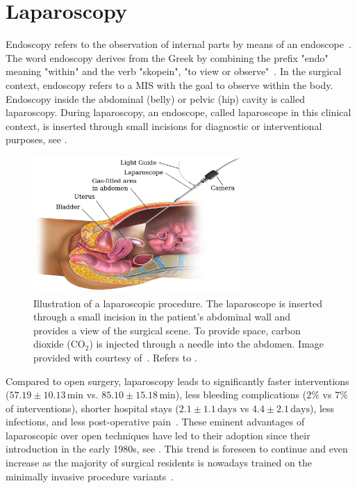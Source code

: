 \section{Laparoscopy}
\label{in:sec:laparoscopy}
Endoscopy refers to the observation of internal parts by means of an endoscope~\cite{oedendoscopy}. The word endoscopy derives from the Greek by combining the prefix "endo" meaning "within" and the verb "skopein", "to view or observe"~\cite{majumdar1993short}. In the surgical context, endoscopy refers to a MIS with the goal to observe within the body. Endoscopy inside the abdominal (belly) or pelvic (hip) cavity is called laparoscopy. During laparoscopy, an endoscope, called laparoscope in this clinical context, is inserted through small incisions for diagnostic or interventional purposes, see .
\begin{figure}[tb]
    \centering
    \includegraphics[width=0.7\textwidth]{introduction/img/laparoscopy.jpg}
    \caption{Illustration of a laparoscopic procedure. The laparoscope is inserted through a small incision in the patient's abdominal wall and provides a view of the surgical scene. To provide space, carbon dioxide ($\text{CO}_2$) is injected through a needle into the abdomen. Image provided with courtesy of~\cite{blausen2014laparoscopy}. Refers to .}
    \label{in:fig:laparoscopy}
\end{figure}

Compared to open surgery, laparoscopy leads to significantly faster interventions ($57.19\pm10.13\,\text{min}$ vs. $85.10\pm15.18\,\text{min}$), less bleeding complications ($2\%$ vs $7\%$ of interventions), shorter hospital stays ($2.1\pm1.1\,\text{days}$ vs $4.4\pm2.1\,\text{days}$), less infections, and less post-operative pain~\cite{shi2023laparoscopic}. These eminent advantages of laparoscopic over open techniques have led to their adoption since their introduction in the early 1980s, see . This trend is foreseen to continue and even increase as the majority of surgical residents is nowadays trained on the minimally invasive procedure variants~\cite{john2020rise}.


